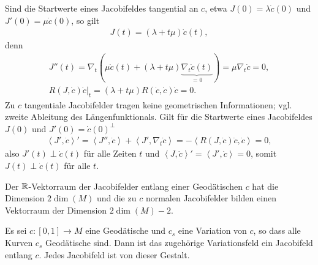 Sind die Startwerte eines Jacobifeldes tangential an $c$, etwa $J(0) =
\lambda \dot c(0)$ und $J'(0) = \mu \dot c(0)$, so gilt
\begin{align*}
  J(t) = (\lambda + t\mu)\dot c(t),
\end{align*}
denn
\begin{align*}
  J''(t) = \nabla_t(\mu \dot c(t) + (\lambda + t \mu)\underbrace{\nabla_t\dot c(t)}_{=0}) = \mu\nabla_t\dot c = 0,\\
  \left.R(J,\dot c)\dot c\right|_t = (\lambda + t\mu)R(\dot c, \dot c)\dot c = 0.
\end{align*}
Zu $c$ tangentiale Jacobifelder tragen keine geometrischen Informationen; vgl. zweite Ableitung des Längenfunktionals.
Gilt für die Startwerte eines Jacobifeldes $J(0)$ und $J'(0) = \dot c(0)^{\perp}$
\begin{align*}
  \left<J',\dot c\right>' = \left<J'',\dot c\right> + \left<J', \nabla_t\dot c\right> = - \left<R(J,\dot c)\dot c,\dot c\right> = 0,
\end{align*}
also $J'(t) \perp \dot c(t)$ für alle Zeiten $t$ und $\left<J,\dot c\right>' = \left<J',\dot c\right> = 0$, somit $J(t) \perp \dot c(t)$ für alle $t$.

Der $\operatorname{\mathbb{R}}$-Vektorraum der Jacobifelder entlang einer Geodätischen $c$ hat die Dimension $2 \dim(M)$ und die zu $c$ normalen Jacobifelder bilden einen Vektorraum der Dimension $2 \dim(M) - 2$.

\begin{Satz}\label{satz-9-5}
  Es sei $c \colon [0,1] \to M$ eine Geodätische und $c_s$ eine Variation von $c$, so dass alle Kurven $c_s$ Geodätische sind.
  Dann ist das zugehörige Variationsfeld ein Jacobifeld entlang $c$.
  Jedes Jacobifeld ist von dieser Gestalt.
\end{Satz}

